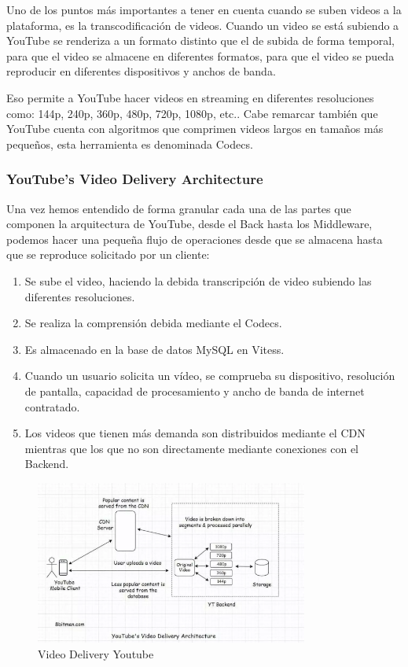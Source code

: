\documentclass[12pt,a4paper]{article}
\begin{document}
    Uno de los puntos más importantes a tener en cuenta cuando se suben videos a la plataforma, es la transcodificación de videos. Cuando un video se está subiendo a YouTube se renderiza a un formato distinto que el de subida de forma temporal, para que el video se almacene en diferentes formatos, para que el video se pueda reproducir en diferentes dispositivos y anchos de banda.

    Eso permite a YouTube hacer videos en streaming en diferentes resoluciones como: 144p, 240p, 360p, 480p, 720p, 1080p, etc.. Cabe remarcar también que YouTube cuenta con algoritmos que comprimen videos largos en tamaños más pequeños, esta herramienta es denominada Codecs. 

    \subsubsection{YouTube's Video Delivery Architecture}

    Una vez hemos entendido de forma granular cada una de las partes que componen la arquitectura de YouTube, desde el Back hasta los Middleware, podemos hacer una pequeña flujo de operaciones desde que se almacena hasta que se reproduce solicitado por un cliente:

    \begin{enumerate}
        \item Se sube el video, haciendo la debida transcripción de video subiendo las diferentes resoluciones.
        \item Se realiza la comprensión debida mediante el Codecs.
        \item Es almacenado en la base de datos MySQL en Vitess.
        \item Cuando un usuario solicita un vídeo, se comprueba su dispositivo, resolución de pantalla, capacidad de procesamiento y ancho de banda de internet contratado.
        \item Los videos que tienen más demanda son distribuidos mediante el CDN mientras que los que no son directamente mediante conexiones con el Backend. 
    \end{enumerate}

    \begin{figure}[H]
        \centering
        \includegraphics[width=0.8\textwidth]{./img/video_delivery_youtube.png}
        \caption{Video Delivery Youtube}
        \label{fig:video_delivery_youtube}
    \end{figure}
\end{document}
